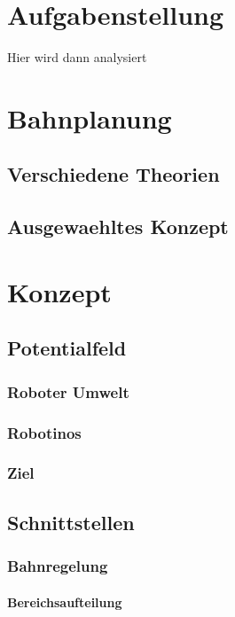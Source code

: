 \newpage
\chapter{Aufgabenstellung}

Hier wird dann analysiert
\chapter{Bahnplanung}
\section{Verschiedene Theorien}
\section{Ausgewaehltes Konzept}

\chapter{Konzept}
\section{Potentialfeld}
\subsection{Roboter Umwelt}
\subsection{Robotinos}
\subsection{Ziel}

\section{Schnittstellen}
\subsection{Bahnregelung}
\subsubsection{Bereichsaufteilung}
